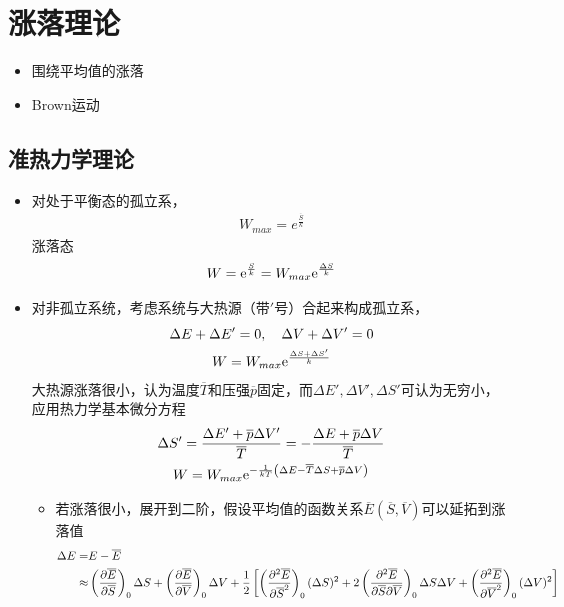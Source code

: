 \chapter{涨落理论}

\begin{itemize}
    \item 围绕平均值的涨落
    \item Brown运动
\end{itemize}

\section{准热力学理论}

\begin{itemize}
    \item 对处于平衡态的孤立系，
    \begin{gather*}
        W_{max} = e^{\frac{\overline{S}}{k}}
    \end{gather*}
    涨落态
    \begin{gather*}
        W = \mathrm{e}^{\frac{S}{k}} = W_{max} \mathrm{e}^{\frac{\Delta S}{k}}
    \end{gather*}
    \item 对非孤立系统，考虑系统与大热源（带$'$号）合起来构成孤立系，
    \begin{gather*}
        \Delta E + \Delta E' = 0, \quad \Delta V + \Delta V' = 0
        \\
        W = W_{max} \mathrm{e}^{\frac{\Delta S + \Delta S'}{k}}
    \end{gather*}
    大热源涨落很小，认为温度$\overline{T}$和压强$\overline{p}$固定，而$\Delta E',\Delta V',\Delta S'$可认为无穷小，应用热力学基本微分方程
    \begin{gather*}
        \Delta S' =\frac{\Delta E' + \overline{p} \Delta V'}{\overline{T}} = -\frac{\Delta E + \overline{p} \Delta V}{\overline{T}}
        \\
        W = W_{max} \mathrm{e}^{-\frac{1}{kT}\left(\Delta E - \overline{T} \Delta S + \overline{p} \Delta V\right)}
    \end{gather*}
    \begin{itemize}
        \item 若涨落很小，展开到二阶，假设平均值的函数关系$\overline{E}( \overline{S}, \overline{V})$可以延拓到涨落值
        \begin{align*}
            \Delta E =& E - \overline{E} 
            \\
            \approx& \left(\pt{\overline{E}}{\overline{S}}\right)_0 \Delta S + \left(\pt{\overline{E}}{\overline{V}}\right)_0 \Delta V + \frac{1}{2} \left[ \left(\pt{^2 \overline{E}}{\overline{S}^2}\right)_0 (\Delta S)^2 + 2 \left(\pt{^2 \overline{E}}{\overline{S} \partial \overline{V}}\right)_0 \Delta S \Delta V + \left(\pt{^2 \overline{E}}{\overline{V}^2}\right)_0 (\Delta V)^2 \right]

\end{align*}
\end{itemize}
\end{itemize}
